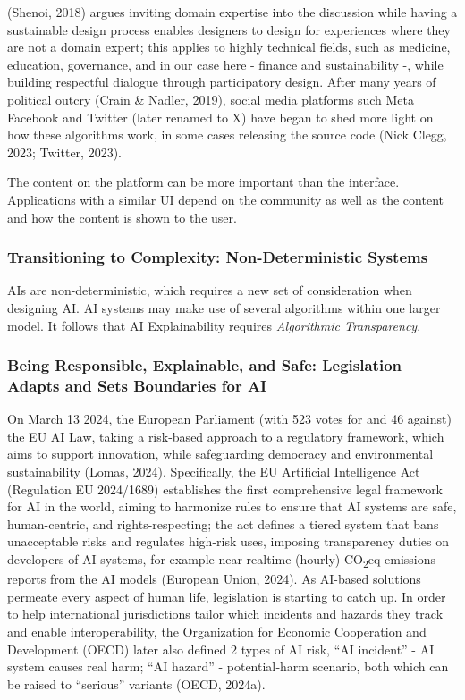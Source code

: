 \documentclass[
  12pt,
  letterpaper,
  DIV=11,
  numbers=noendperiod]{scrartcl}
\begin{document}
(Shenoi, 2018) argues inviting domain expertise into the discussion
while having a sustainable design process enables designers to design
for experiences where they are not a domain expert; this applies to
highly technical fields, such as medicine, education, governance, and in
our case here - finance and sustainability -, while building respectful
dialogue through participatory design. After many years of political
outcry (Crain \& Nadler, 2019), social media platforms such Meta
Facebook and Twitter (later renamed to X) have began to shed more light
on how these algorithms work, in some cases releasing the source code
(Nick Clegg, 2023; Twitter, 2023).

The content on the platform can be more important than the interface.
Applications with a similar UI depend on the community as well as the
content and how the content is shown to the user.

\subsubsection{Transitioning to Complexity: Non-Deterministic
Systems}\label{transitioning-to-complexity-non-deterministic-systems}

AIs are non-deterministic, which requires a new set of consideration
when designing AI. AI systems may make use of several algorithms within
one larger model. It follows that AI Explainability requires
\emph{Algorithmic Transparency}.

\subsubsection{Being Responsible, Explainable, and Safe: Legislation
Adapts and Sets Boundaries for
AI}\label{being-responsible-explainable-and-safe-legislation-adapts-and-sets-boundaries-for-ai}

On March 13 2024, the European Parliament (with 523 votes for and 46
against) the EU AI Law, taking a risk-based approach to a regulatory
framework, which aims to support innovation, while safeguarding
democracy and environmental sustainability (Lomas, 2024). Specifically,
the EU Artificial Intelligence Act (Regulation EU 2024/1689) establishes
the first comprehensive legal framework for AI in the world, aiming to
harmonize rules to ensure that AI systems are safe, human-centric, and
rights-respecting; the act defines a tiered system that bans
unacceptable risks and regulates high-risk uses, imposing transparency
duties on developers of AI systems, for example near-realtime (hourly)
CO\textsubscript{2}eq emissions reports from the AI models (European
Union, 2024). As AI-based solutions permeate every aspect of human life,
legislation is starting to catch up. In order to help international
jurisdictions tailor which incidents and hazards they track and enable
interoperability, the Organization for Economic Cooperation and
Development (OECD) later also defined 2 types of AI risk, ``AI
incident'' - AI system causes real harm; ``AI hazard'' - potential‐harm
scenario, both which can be raised to ``serious'' variants (OECD,
2024a).
\end{document}
